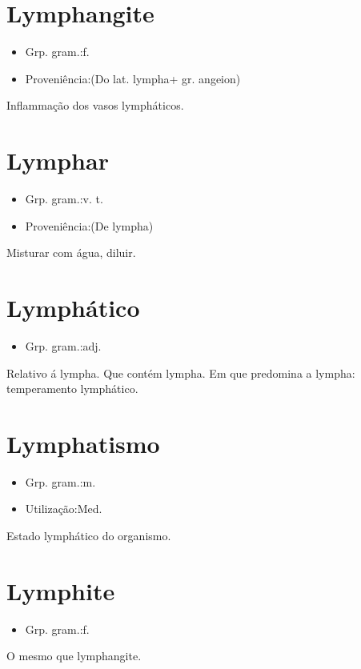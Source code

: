 \section{Lymphangite}
\begin{itemize}
\item {Grp. gram.:f.}
\end{itemize}
\begin{itemize}
\item {Proveniência:(Do lat. \textunderscore lympha\textunderscore  + gr. \textunderscore angeion\textunderscore )}
\end{itemize}
Inflammação dos vasos lympháticos.
\section{Lymphar}
\begin{itemize}
\item {Grp. gram.:v. t.}
\end{itemize}
\begin{itemize}
\item {Proveniência:(De \textunderscore lympha\textunderscore )}
\end{itemize}
Misturar com água, diluir.
\section{Lymphático}
\begin{itemize}
\item {Grp. gram.:adj.}
\end{itemize}
Relativo á lympha.
Que contém lympha.
Em que predomina a lympha: \textunderscore temperamento lymphático\textunderscore .
\section{Lymphatismo}
\begin{itemize}
\item {Grp. gram.:m.}
\end{itemize}
\begin{itemize}
\item {Utilização:Med.}
\end{itemize}
Estado lymphático do organismo.
\section{Lymphite}
\begin{itemize}
\item {Grp. gram.:f.}
\end{itemize}
O mesmo que \textunderscore lymphangite\textunderscore .
